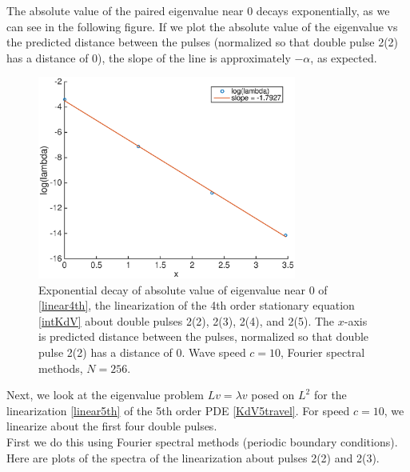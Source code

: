 \documentclass[12pt]{article}
\begin{document}
The absolute value of the paired eigenvalue near 0 decays exponentially, as we can see in the following figure. If we plot the absolute value of the eigenvalue vs the predicted distance between the pulses (normalized so that double pulse 2(2) has a distance of 0), the slope of the line is approximately $-\alpha$, as expected.
\begin{figure}[H]
	\includegraphics[width=8.5cm]{decayinteigenvalue}
	\caption{Exponential decay of absolute value of eigenvalue near 0 of \eqref{linear4th}, the linearization of the 4th order stationary equation \eqref{intKdV} about double pulses 2(2), 2(3), 2(4), and 2(5). The $x$-axis is predicted distance between the pulses, normalized so that double pulse 2(2) has a distance of 0. Wave speed $c = 10$, Fourier spectral methods, $N = 256$.}
\end{figure}

Next, we look at the eigenvalue problem $Lv = \lambda v$ posed on $L^2$ for the linearization \eqref{linear5th} of the 5th order PDE \eqref{KdV5travel}. For speed $c = 10$, we linearize about the first four double pulses.\\

First we do this using Fourier spectral methods (periodic boundary conditions). Here are plots of the spectra of the linearization about pulses 2(2) and 2(3).
\end{document}
